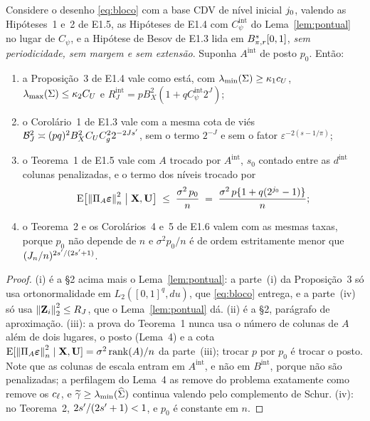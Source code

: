 \documentclass[11pt,a4paper]{article}
\newcommand{\lmin}{\lambda_{\min}}
\newcommand{\lmax}{\lambda_{\max}}
\newcommand{\Amat}{A}
\newcommand{\Bmat}{B}
\newcommand{\PA}{\Pi_{\Amat}}
\newcommand{\bveps}{\boldsymbol{\varepsilon}}
\newcommand{\eps}{\varepsilon}
\newcommand{\Cpsiint}{C_{\psi}^{\mathrm{int}}}
\newcommand{\dint}{d^{\mathrm{int}}}
\newcommand{\pzero}{p_{0}}
\newcommand{\gtil}{\widetilde{\gamma}}   %
\begin{document}
\begin{proposition}\label{prop:cdv}
Considere o desenho \eqref{eq:bloco} com a base CDV de nível inicial
$j_{0}$, valendo as Hipóteses~1 e~2 de E1.5, as Hipóteses de E1.4 com
$\Cpsiint$ do Lema~\ref{lem:pontual} no lugar de $C_{\psi}$, e a Hipótese de
Besov de E1.3 lida em $B^{s}_{\pi,r}[0,1]$, \emph{sem periodicidade,
sem margem e sem extensão}. Suponha $\Amat^{\mathrm{int}}$ de posto $\pzero$.
Então:
\begin{enumerate}[label=\textup{(\roman*)}, leftmargin=*]
  \item a Proposição~3 de E1.4 vale como está, com
    $\lmin(\Gram) \ge \kappa_{1}c_{U}$,
    $\lmax(\Gram) \le \kappa_{2}C_{U}$ e
    $R_{J}^{\mathrm{int}} = pB_{X}^{2}(1+q\Cpsiint 2^{J})$;
  \item o Corolário~1 de E1.3 vale com a mesma cota de viés
    $\mathcal{B}_{J}^{2}\asymp (pq)^{2}B_{X}^{2}C_{U}C_{g}^{2}2^{-2Js'}$,
    sem o termo $2^{-J}$ e sem o fator $\eps^{-2(s-1/\pi)}$;
  \item o Teorema~1 de E1.5 vale com $\Amat$ trocado por
    $\Amat^{\mathrm{int}}$, $s_{0}$ contado entre as $\dint$ colunas
    penalizadas, e o termo dos níveis trocado por
    \[
      \E\bigl[\normn{\PA\bveps}^{2}\bigm|\bX,\bU\bigr]
      \;\le\; \frac{\sigma^{2}\,\pzero}{n}
      \;=\; \frac{\sigma^{2}\,p\{1+q(2^{\jzero}-1)\}}{n};
    \]
  \item o Teorema~2 e os Corolários~4 e~5 de E1.6 valem com as mesmas taxas,
    porque $\pzero$ não depende de $n$ e $\sigma^{2}\pzero/n$ é de ordem
    estritamente menor que $(J_{n}/n)^{2s'/(2s'+1)}$.
\end{enumerate}
\end{proposition}

\begin{proof}
(i) é a §2 acima mais o Lema~\ref{lem:pontual}: a parte~(i) da Proposição~3 só
usa ortonormalidade em $L_{2}([0,1]^{q},du)$, que \eqref{eq:bloco} entrega, e
a parte~(iv) só usa $\left\lVert \mathbf{Z}_{i} \right\rVert_{2}^{2}\le R_{J}$, que o
Lema~\ref{lem:pontual} dá. (ii) é a §2, parágrafo de aproximação. (iii): a
prova do Teorema~1 nunca usa o número de colunas de $\Amat$ além de dois
lugares, o posto (Lema~4) e a cota
$\E[\normn{\PA\bveps}^{2}\mid\bX,\bU] = \sigma^{2}\operatorname{rank}
(\Amat)/n$ da parte~(iii); trocar $p$ por $\pzero$ é trocar o posto. Note que
as colunas de escala entram em $\Amat^{\mathrm{int}}$, e não em
$\Bmat^{\mathrm{int}}$, porque não são penalizadas; a perfilagem do Lema~4 as
remove do problema exatamente como remove os $c_{\ell}$, e
$\gtil \ge \lmin(\Gramhat)$ continua valendo pelo complemento de Schur.
(iv): no Teorema~2, $2s'/(2s'+1) < 1$, e $\pzero$ é constante em $n$.
\end{proof}
\end{document}
